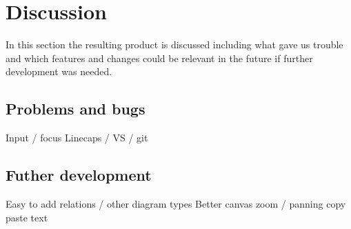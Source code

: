 \section{Discussion}
In this section the resulting product is discussed including what gave us trouble and
which features and changes could be relevant in the future if further
development was needed.

\subsection{Problems and bugs}
Input / focus
Linecaps / VS / git

\subsection{Futher development}
Easy to add relations / other diagram types
Better canvas zoom / panning
copy paste text